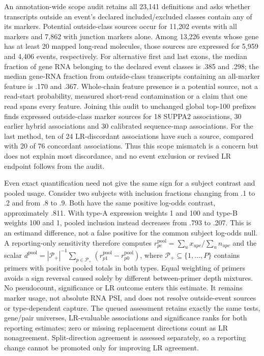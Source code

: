 \documentclass[11pt]{article}
\begin{document}
An annotation-wide scope audit retains all 23,141 definitions and asks whether transcripts outside an event's declared included/excluded classes contain any of its markers. Potential outside-class sources occur for 11,202 events with all markers and 7,862 with junction markers alone. Among 13,226 events whose gene has at least 20 mapped long-read molecules, those sources are expressed for 5,959 and 4,406 events, respectively. For alternative first and last exons, the median fraction of gene RNA belonging to the declared event classes is .385 and .298; the median gene-RNA fraction from outside-class transcripts containing an all-marker feature is .170 and .367. Whole-chain feature presence is a potential source, not a read-start probability, measured short-read contamination or a claim that one read spans every feature. Joining this audit to unchanged global top-100 prefixes finds expressed outside-class marker sources for 18 SUPPA2 associations, 30 earlier hybrid associations and 30 calibrated sequence-map associations. For the last method, ten of 24 LR-discordant associations have such a source, compared with 20 of 76 concordant associations. Thus this scope mismatch is a concern but does not explain most discordance, and no event exclusion or revised LR endpoint follows from the audit.

Even exact quantification need not give the same sign for a subject contrast and pooled usage. Consider two subjects with inclusion fractions changing from .1 to .2 and from .8 to .9. Both have the same positive log-odds contrast, approximately .811. With type-A expression weights 1 and 100 and type-B weights 100 and 1, pooled inclusion instead decreases from .793 to .207. This is an estimand difference, not a false positive for the common subject log-odds null. A reporting-only sensitivity therefore computes \(r_{pc}^{\mathrm{pool}}=\sum_u x_{upc}/\sum_u n_{upc}\) and the scalar \(d^{\mathrm{pool}}=|\mathcal P_+|^{-1}\sum_{p\in\mathcal P_+}(r_{p1}^{\mathrm{pool}}-r_{p0}^{\mathrm{pool}})\), where \(\mathcal P_+\subseteq\{1,\ldots,P\}\) contains primers with positive pooled totals in both types. Equal weighting of primers avoids a sign reversal caused solely by different between-primer depth mixtures. No pseudocount, significance or LR outcome enters this estimate. It remains marker usage, not absolute RNA PSI, and does not resolve outside-event sources or type-dependent capture. The queued assessment retains exactly the same tests, gene/pair universes, LR-evaluable associations and significance ranks for both reporting estimates; zero or missing replacement directions count as LR nonagreement. Split-direction agreement is assessed separately, so a reporting change cannot be promoted only for improving LR agreement.
\end{document}
